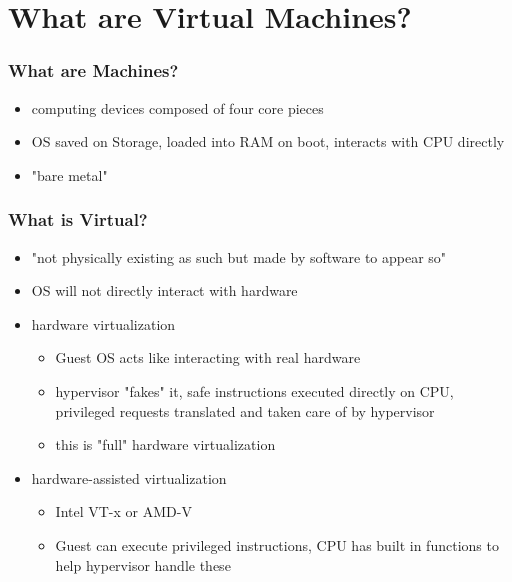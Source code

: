 \documentclass{beamer}
\begin{document}
\section[Basics]{What are Virtual Machines?}

\begin{frame}
    \frametitle{What are Machines?}
    \begin{itemize}
        \item computing devices composed of four core pieces
        \item OS saved on Storage, loaded into RAM on boot, interacts with CPU directly
        \item "bare metal"
    \end{itemize}
\end{frame}

\begin{frame}
    \frametitle{What is Virtual?}
    \begin{itemize}
        \item "not physically existing as such but made by software to appear so"
        \item OS will not directly interact with hardware
        \item hardware virtualization
            \begin{itemize}
                \item Guest OS acts like interacting with real hardware
                \item hypervisor "fakes" it, safe instructions executed directly on CPU, privileged requests translated and taken care of by hypervisor 
                \item this is "full" hardware virtualization
            \end{itemize}
        \item hardware-assisted virtualization
            \begin{itemize}
                \item Intel VT-x or AMD-V
                \item Guest can execute privileged instructions, CPU has built in functions to help hypervisor handle these
            \end{itemize}
    \end{itemize}
\end{frame}
\end{document}
